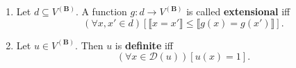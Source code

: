 \begin{enumerate}
\item Let $d \subseteq V^{(\mathbf{B})}$. A function $g: d \rightarrow V^{(\mathbf{B})}$ is called \textbf{extensional} iff
$$(\forall x, x' \in d)[\llbracket x = x' \rrbracket \leq \llbracket g(x) = g(x') \rrbracket].$$
\item Let $u \in V^{(\mathbf{B})}$. Then $u$ is \textbf{definite} iff
$$(\forall x \in \mathcal{D}(u))[u(x) = 1].$$
\end{enumerate}
